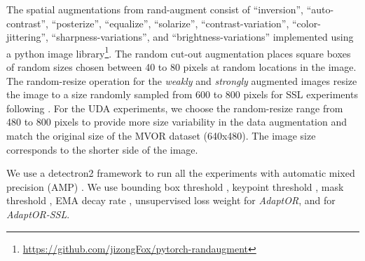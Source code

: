 The spatial augmentations from rand-augment \citep{cubuk2020randaugment} consist of ``inversion'', ``auto-contrast'', ``posterize'', ``equalize'', ``solarize'', ``contrast-variation'', ``color-jittering'', ``sharpness-variations'', and  ``brightness-variations'' {\blue implemented using a python image library\footnote{\url{https://github.com/jizongFox/pytorch-randaugment}}}. 
The random cut-out \citep{devries2017improved} augmentation places square boxes of random sizes chosen between 40 to 80 pixels at random locations in the image. The random-resize operation for the \emph{weakly} and \emph{strongly} augmented images resize the image to a size randomly sampled from 600 to 800 pixels for SSL experiments following \citep{he2017mask}. For the UDA experiments, we choose the random-resize range from 480 to 800 pixels to provide more size variability in the data augmentation and match the original size of the MVOR dataset (640x480). The image size corresponds to the shorter side of the image.

We use a detectron2 framework \citep{wu2019detectron2} to run all the experiments with automatic mixed precision (AMP) \citep{micikevicius2017mixed}. We use bounding box threshold , keypoint threshold , mask threshold , EMA decay rate , unsupervised loss weight  for \emph{AdaptOR}, and  for \emph{AdaptOR-SSL}.

